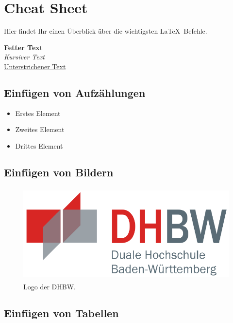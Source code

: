 \chapter{Cheat Sheet}\label{chapter:cheat_sheet}

Hier findet Ihr einen Überblick über die wichtigsten \LaTeX\ Befehle.

\textbf{Fetter Text} \\
\textit{Kursiver Text} \\
\underline{Unterstrichener Text} \\

\section{Einfügen von Aufzählungen}\label{section:aufzaehlungen}

\begin{itemize}
    \item Erstes Element
    \item Zweites Element
    \item Drittes Element
\end{itemize}

\section{Einfügen von Bildern}\label{section:bilder}

\begin{figure}[htb]
    \centering
    \includegraphics[height=5cm]{lib/graphics/dhbw.png}
    \caption[Logo der DHBW]{Logo der DHBW.\footnotemark}
    \label{abb:DHBWLogo}
\end{figure}

\section{Einfügen von Tabellen}\label{section:tabellen}

